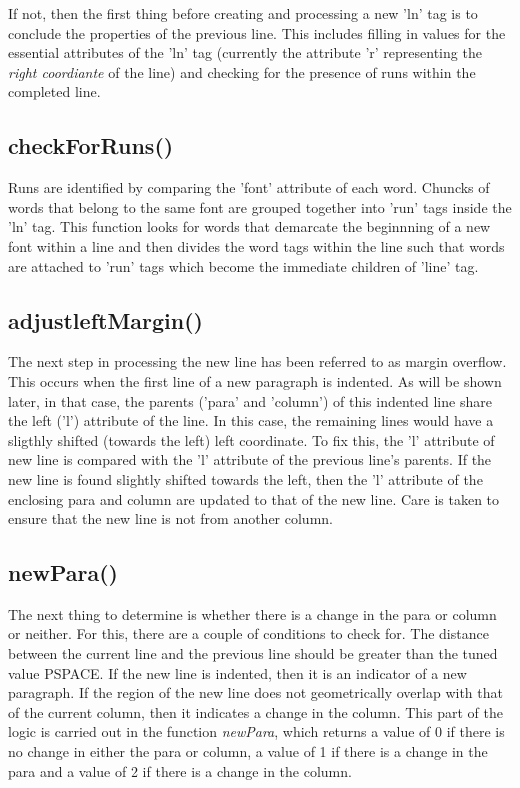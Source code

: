 If not, then the first thing before creating and processing a new 'ln' tag is to conclude the properties of the previous line.
This includes filling in values for the essential attributes of the 'ln' tag (currently the attribute 'r' representing the \emph{right coordiante} of the line) and checking for the presence of runs within the completed line.

\subsection{checkForRuns()}
Runs are identified by comparing the 'font' attribute of each word.
Chuncks of words that belong to the same font are grouped together into 'run' tags inside the 'ln' tag.
This function looks for words that demarcate the beginnning of a new font within a line and then divides the word tags within the line such that words are attached to 'run' tags which become the immediate children of 'line' tag.

\subsection{adjustleftMargin()}
The next step in processing the new line has been referred to as margin overflow.
This occurs when the first line of a new paragraph is indented.
As will be shown later, in that case, the parents ('para' and 'column') of this indented line share the left ('l') attribute of the line.
In this case, the remaining lines would have a sligthly shifted (towards the left) left coordinate.
To fix this, the 'l' attribute of new line is compared with the 'l' attribute of the previous line's parents.
If the new line is found slightly shifted towards the left, then the 'l' attribute of the enclosing para and column are updated to that of the new line.
Care is taken to ensure that the new line is not from another column.

\subsection{newPara()}
The next thing to determine is whether there is a change in the para or column or neither.
For this, there are a couple of conditions to check for.
The distance between the current line and the previous line should be greater than the tuned value PSPACE.
If the new line is indented, then it is an indicator of a new paragraph.
If the region of the new line does not geometrically overlap with that of the current column, then it indicates a change in the column.
This part of the logic is carried out in the function \emph{newPara}, which returns a value of 0 if there is no change in either the para or column, a value of 1 if there is a change in the para and a value of 2 if there is a change in the column.

